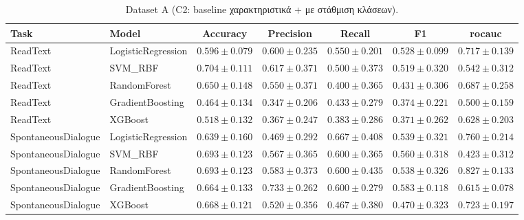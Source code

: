 \begin{table}[H]
    \centering
    \caption{Dataset A (C2: baseline χαρακτηριστικά + με στάθμιση κλάσεων).}
    \label{tab:appendix-c2-dataset-a}
    \scriptsize
    \begin{tabular}{@{}llccccc@{}}
        \toprule
        Task & Model & Accuracy & Precision & Recall & F1 & \gls{rocauc} \\
        \midrule
        ReadText & LogisticRegression & $0.596 \pm 0.079$ & $0.600 \pm 0.235$ & $0.550 \pm 0.201$ & $0.528 \pm 0.099$ & $0.717 \pm 0.139$ \\
        ReadText & SVM\_RBF & $0.704 \pm 0.111$ & $0.617 \pm 0.371$ & $0.500 \pm 0.373$ & $0.519 \pm 0.320$ & $0.542 \pm 0.312$ \\
        ReadText & RandomForest & $0.650 \pm 0.148$ & $0.550 \pm 0.371$ & $0.400 \pm 0.365$ & $0.431 \pm 0.306$ & $0.687 \pm 0.258$ \\
        ReadText & GradientBoosting & $0.464 \pm 0.134$ & $0.347 \pm 0.206$ & $0.433 \pm 0.279$ & $0.374 \pm 0.221$ & $0.500 \pm 0.159$ \\
        ReadText & XGBoost & $0.518 \pm 0.132$ & $0.367 \pm 0.247$ & $0.383 \pm 0.286$ & $0.371 \pm 0.262$ & $0.628 \pm 0.203$ \\
        \midrule
        SpontaneousDialogue & LogisticRegression & $0.639 \pm 0.160$ & $0.469 \pm 0.292$ & $0.667 \pm 0.408$ & $0.539 \pm 0.321$ & $0.760 \pm 0.214$ \\
        SpontaneousDialogue & SVM\_RBF & $0.693 \pm 0.123$ & $0.567 \pm 0.365$ & $0.600 \pm 0.365$ & $0.560 \pm 0.318$ & $0.423 \pm 0.312$ \\
        SpontaneousDialogue & RandomForest & $0.693 \pm 0.123$ & $0.583 \pm 0.373$ & $0.600 \pm 0.435$ & $0.538 \pm 0.326$ & $0.827 \pm 0.133$ \\
        SpontaneousDialogue & GradientBoosting & $0.664 \pm 0.133$ & $0.733 \pm 0.262$ & $0.600 \pm 0.279$ & $0.583 \pm 0.118$ & $0.615 \pm 0.078$ \\
        SpontaneousDialogue & XGBoost & $0.668 \pm 0.121$ & $0.520 \pm 0.356$ & $0.467 \pm 0.380$ & $0.470 \pm 0.323$ & $0.723 \pm 0.197$ \\
        \bottomrule
    \end{tabular}
\end{table}

